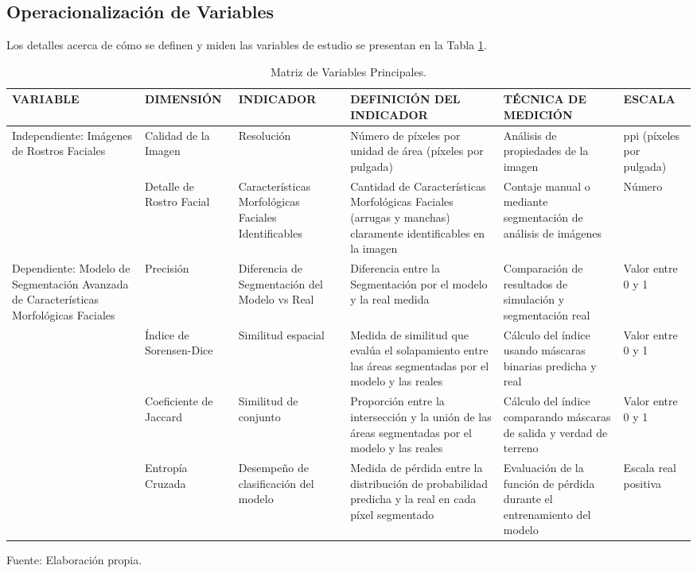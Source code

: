\subsection{Operacionalización de Variables}
Los detalles acerca de cómo se definen y miden las variables de estudio se presentan en la Tabla \ref{tabla:variables}.

\begin{longtable}{>{\raggedright\arraybackslash}m{3cm} >{\raggedright\arraybackslash}m{2cm} >{\raggedright\arraybackslash}m{2cm} >{\raggedright\arraybackslash}m{3cm} >{\raggedright\arraybackslash}m{2cm} >{\raggedright\arraybackslash}m{2.5cm}}
    \caption{Matriz de Variables Principales.}
    \label{tabla:variables}\\
    \hline
    VARIABLE & DIMENSIÓN & INDICADOR & DEFINICIÓN DEL INDICADOR & TÉCNICA DE MEDICIÓN & ESCALA \\
    \hline
    Independiente: Imágenes de Rostros Faciales & Calidad de la Imagen & Resolución & Número de píxeles por unidad de área (píxeles por pulgada) & Análisis de propiedades de la imagen & ppi (píxeles por pulgada) \\
    \cline{2-6}
     & Detalle de Rostro Facial & Características Morfológicas Faciales Identificables & Cantidad de Características Morfológicas Faciales (arrugas y manchas) claramente identificables en la imagen & Contaje manual o mediante segmentación de análisis de imágenes & Número \\
    \hline
    Dependiente: Modelo de Segmentación Avanzada de Características Morfológicas Faciales & Precisión & Diferencia de Segmentación del Modelo vs Real & Diferencia entre la Segmentación por el modelo y la real medida & Comparación de resultados de simulación y segmentación real & Valor entre 0 y 1 \\
    \cline{2-6}
     & Índice de Sorensen-Dice & Similitud espacial & Medida de similitud que evalúa el solapamiento entre las áreas segmentadas por el modelo y las reales & Cálculo del índice usando máscaras binarias predicha y real & Valor entre 0 y 1 \\
    \cline{2-6}
     & Coeficiente de Jaccard & Similitud de conjunto & Proporción entre la intersección y la unión de las áreas segmentadas por el modelo y las reales & Cálculo del índice comparando máscaras de salida y verdad de terreno & Valor entre 0 y 1 \\
    \cline{2-6}
	& Entropía Cruzada & Desempeño de clasificación del modelo &  Medida de pérdida entre la distribución de probabilidad predicha y la real en cada píxel segmentado & Evaluación de la función de pérdida durante el entrenamiento del modelo & Escala real positiva \\
    \hline
\end{longtable}
\begin{flushleft}	%
	\small Fuente: Elaboración propia.
\end{flushleft}

